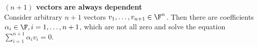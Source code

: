 \textbf{$(n+1)$ vectors are always dependent}\\
 Consider arbitrary $n+1$ vectors $v_1,\ldots,v_{n+1}\in\F^n$. Then there are coefficients $\alpha_i\in\F, i=1,\ldots ,n+1$, which are not all zero and solve the equation $\sum_{i=1}^{n+1}\alpha_iv_i=0$.  
 
 
 

 
